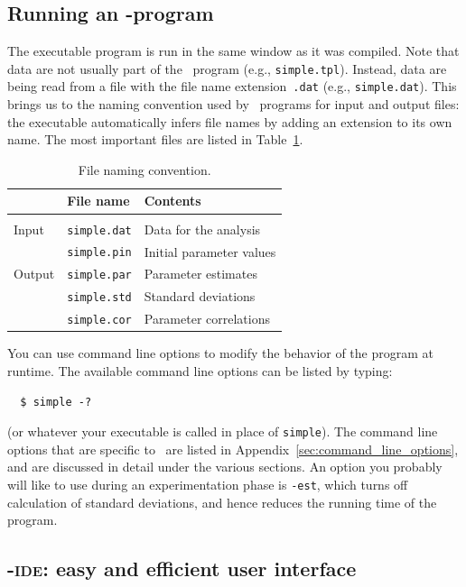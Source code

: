 \documentclass{admbmanual}
\begin{document}
\subsection{Running an \scAB-program}

The executable program is run in the same window as it was compiled. Note that
data are not usually part of the \scAB\ program (e.g., \texttt{simple.tpl}).
Instead, data are being read from a file with the file name
extension~\texttt{.dat} (e.g., \texttt{simple.dat}). This brings us to the
naming convention used by \scAB\ programs for input and output files: the
executable automatically infers file names by adding an extension to its own
name. The most important files are listed in Table~\ref{tab:important-files}.
\begin{table}[h]
\begin{center}
\begin{tabular}{@{\vrule height 12pt depth 6pt width0pt} l l l }
\hline
& \textbf{File name} & \textbf{Contents} \\ \hline\\[-17pt]
Input & \texttt{simple.dat} & Data for the analysis \\
& \texttt{simple.pin} & Initial parameter values \\ \hline
Output & \texttt{simple.par} & Parameter estimates \\
& \texttt{simple.std} & Standard deviations \\
& \texttt{simple.cor} & Parameter correlations\\
\hline
\end{tabular}
\end{center}
\caption{File naming convention.}
\label{tab:important-files}
\end{table}
You can use command line options to modify the behavior of the program at
runtime. The available command line options can be listed by typing:
\begin{lstlisting}
  $ simple -?
\end{lstlisting}
(or whatever your executable is called in place of \texttt{simple}). The command
line options that are specific to \scAR\ are listed in
Appendix~\ref{sec:command_line_options}, and are discussed in detail under the
various sections. An option you probably will like to use during an
experimentation phase is \texttt{-est}, which turns off calculation of standard
deviations, and hence reduces the running time of the program.

\subsection{\scAB-\textsc{ide}: easy and efficient user interface}
\end{document}
